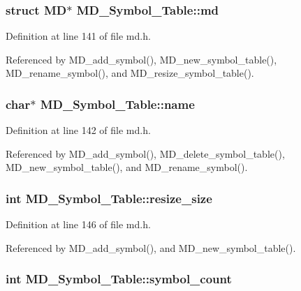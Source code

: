 \subsubsection{\setlength{\rightskip}{0pt plus 5cm}struct \bf{MD}$\ast$ \bf{MD\_\-Symbol\_\-Table::md}}\label{structMD__Symbol__Table_fa75ed2916d325268bbfec592fe70056}




Definition at line 141 of file md.h.

Referenced by MD\_\-add\_\-symbol(), MD\_\-new\_\-symbol\_\-table(), MD\_\-rename\_\-symbol(), and MD\_\-resize\_\-symbol\_\-table().
\subsubsection{\setlength{\rightskip}{0pt plus 5cm}char$\ast$ \bf{MD\_\-Symbol\_\-Table::name}}\label{structMD__Symbol__Table_ef9ea279c66cb5b0aff7acaa1112e2cc}




Definition at line 142 of file md.h.

Referenced by MD\_\-add\_\-symbol(), MD\_\-delete\_\-symbol\_\-table(), MD\_\-new\_\-symbol\_\-table(), and MD\_\-rename\_\-symbol().
\subsubsection{\setlength{\rightskip}{0pt plus 5cm}int \bf{MD\_\-Symbol\_\-Table::resize\_\-size}}\label{structMD__Symbol__Table_81daab8b5a98608dc6bdaaf57da5e8b0}




Definition at line 146 of file md.h.

Referenced by MD\_\-add\_\-symbol(), and MD\_\-new\_\-symbol\_\-table().
\subsubsection{\setlength{\rightskip}{0pt plus 5cm}int \bf{MD\_\-Symbol\_\-Table::symbol\_\-count}}\label{structMD__Symbol__Table_560dcf5e5fca3abec8c2379e98e29bd2}




